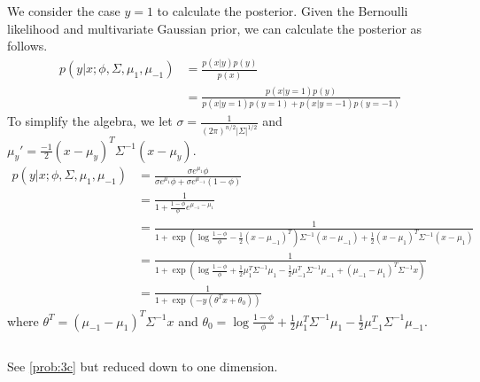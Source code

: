 \documentclass[11pt,a4paper,titlepage]{article}
\begin{document}
\section{}{
\subsection{}{
\quad We consider the case $y=1$ to calculate the posterior. Given the Bernoulli likelihood and multivariate Gaussian prior, we can calculate the posterior as follows.
\begin{align*}
	p(y|x;\phi,\Sigma, \mu_{1}, \mu_{-1}) &= \frac{p(x|y)p(y)}{p(x)}
    \\&=\frac{p(x|y=1)p(y)}{p(x|y=1)p(y=1)+p(x|y=-1)p(y=-1)}
\end{align*}
To simplify the algebra, we let $\sigma = \frac{1}{(2\pi)^{n/2}|\Sigma|^{1/2}}$ and $\mu_{y}' = \frac{-1}{2}(x-\mu_y)^T\Sigma^{-1}(x-\mu_y)$.
\begin{align*}
	p(y|x;\phi,\Sigma, \mu_{1}, \mu_{-1}) &= \frac{\sigma e^{\mu_1} \phi}{\sigma e^{\mu_1} \phi + \sigma e^{\mu_{-1}} (1-\phi)}
    \\&= \frac{1}{1+\frac{1-\phi}{\phi} e^{\mu_{-1} - \mu_1}}
    \\&= \frac{1}{1 + \exp(\log\frac{1-\phi}{\phi} - \frac{1}{2}(x-\mu_{-1})^T) \Sigma^{-1} (x-\mu_{-1}) + \frac{1}{2}(x-\mu_1)^T\Sigma^{-1}(x-\mu_1)}
    \\&= \frac{1}{1+ \exp(\log\frac{1-\phi}{\phi} + \frac{1}{2}\mu_1^T\Sigma^{-1}\mu_1-\frac{1}{2}\mu_{-1}^T\Sigma^{-1}\mu_{-1} + (\mu_{-1}-\mu_1)^T\Sigma^{-1}x)}
    \\&=\frac{1}{1+\exp(-y(\theta^Tx+\theta_0))}
\end{align*}
where $\theta^T = (\mu_{-1}-\mu_1)^T\Sigma^{-1}x$ and $\theta_0 = \log\frac{1-\phi}{\phi} + \frac{1}{2}\mu_1^T\Sigma^{-1}\mu_1-\frac{1}{2}\mu_{-1}^T\Sigma^{-1}\mu_{-1}$.
}\label{prob:3a}
\subsection{}{
\quad See \ref{prob:3c} but reduced down to one dimension.
}\label{prob:3b}
}
\end{document}
